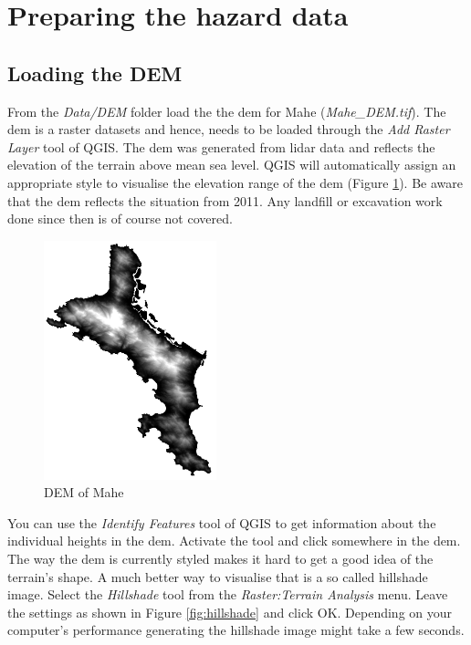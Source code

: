 \documentclass[a4paper,12pt,titlepage]{article}
\begin{document}
\section{Preparing the hazard data}

\subsection{Loading the DEM}

From the \textit{Data/DEM} folder load the the \gls{dem} for Mahe (\textit{Mahe\_DEM.tif}). The \gls{dem} is a raster datasets and hence, needs to be loaded through the \textit{Add Raster Layer} tool of QGIS. The \gls{dem} was generated from \gls{lidar} data and reflects the elevation of the terrain above mean sea level. QGIS will automatically assign an appropriate style to visualise the elevation range of the \gls{dem} (Figure \ref{fig:dem}). Be aware that the \gls{dem} reflects the situation from 2011. Any landfill or excavation work done since then is of course not covered.

\begin{figure}[htb]
\centering
\includegraphics[width=5cm]{Images/dem.png}
\caption{DEM of Mahe}\label{fig:dem}
\end{figure}

You can use the \textit{Identify Features} tool of QGIS to get information about the individual heights in the \gls{dem}. Activate the tool and click somewhere in the \gls{dem}. The way the \gls{dem} is currently styled makes it hard to get a good idea of the terrain's shape. A much better way to visualise that is a so called hillshade image. Select the \textit{Hillshade} tool from the \textit{Raster:Terrain Analysis} menu. Leave the settings as shown in Figure \ref{fig:hillshade} and click OK. Depending on your computer's performance generating the hillshade image might take a few seconds.
\end{document}
